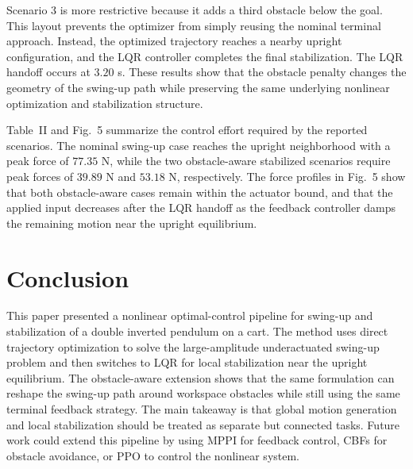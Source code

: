 \documentclass[conference]{IEEEtran}
\begin{document}
Scenario 3 is more restrictive because it adds a third obstacle below the goal. This layout prevents the optimizer from simply reusing the nominal terminal approach. Instead, the optimized trajectory reaches a nearby upright configuration, and the LQR controller completes the final stabilization. The LQR handoff occurs at $3.20$ s. These results show that the obstacle penalty changes the geometry of the swing-up path while preserving the same underlying nonlinear optimization and stabilization structure.

Table~II and Fig.~5 summarize the control effort required by the reported scenarios. The nominal swing-up case reaches the upright neighborhood with a peak force of $77.35$ N, while the two obstacle-aware stabilized scenarios require peak forces of $39.89$ N and $53.18$ N, respectively. The force profiles in Fig.~5 show that both obstacle-aware cases remain within the actuator bound, and that the applied input decreases after the LQR handoff as the feedback controller damps the remaining motion near the upright equilibrium.

\section{Conclusion}
This paper presented a nonlinear optimal-control pipeline for swing-up and stabilization of a double inverted pendulum on a cart. The method uses direct trajectory optimization to solve the large-amplitude underactuated swing-up problem and then switches to LQR for local stabilization near the upright equilibrium. The obstacle-aware extension shows that the same formulation can reshape the swing-up path around workspace obstacles while still using the same terminal feedback strategy. The main takeaway is that global motion generation and local stabilization should be treated as separate but connected tasks. Future work could extend this pipeline by using MPPI for feedback control, CBFs for obstacle avoidance, or PPO to control the nonlinear system.


\end{document}
